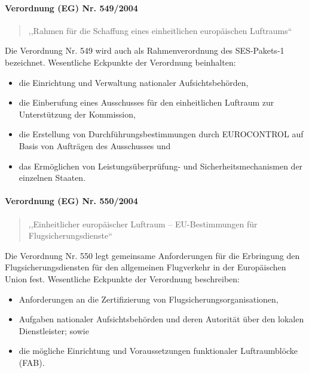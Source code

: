 \pagebreak

\paragraph{Verordnung (EG) Nr. 549/2004} \label{er_549}
    \begin{quote}
        ,,Rahmen für die Schaffung eines einheitlichen europäischen Luftraums``\\
        \cite{2004R0549, 2004R0549_summary}
    \end{quote}
Die Verordnung Nr. 549 wird auch als Rahmenverordnung des \ac{SES}-Pakets-1 bezeichnet.
Wesentliche Eckpunkte der Verordnung beinhalten:
    \begin{itemize}
        \item die Einrichtung und Verwaltung nationaler Aufsichtsbehörden,
        \item die Einberufung eines Ausschusses für den einheitlichen Luftraum zur Unterstützung der Kommission,
        \item die Erstellung von Durchführungsbestimmungen durch EUROCONTROL auf Basis von Aufträgen des Ausschusses und
        \item    das Ermöglichen von Leistungsüberprüfung- und Sicherheitsmechanismen der einzelnen Staaten. \cite{2004R0549_summary}
    \end{itemize}

        
\paragraph{Verordnung (EG) Nr. 550/2004} \label{er_550}
\begin{quote}
    ,,Einheitlicher europäischer Luftraum – EU-Bestimmungen für Flugsicherungsdienste`` 
    \cite{2004R0550, 2004R0550_summary}
\end{quote}
    Die Verordnung Nr. 550 legt gemeinsame Anforderungen für die Erbringung den Flugsicherungsdiensten für den allgemeinen Flugverkehr in der Europäischen Union fest. 
Wesentliche Eckpunkte der Verordnung beschreiben:
    \begin{itemize}
        \item Anforderungen an die Zertifizierung von Flugsicherungsorganisationen,
        \item Aufgaben nationaler Aufsichtsbehörden und deren Autorität über den lokalen Dienstleister; sowie
        \item die mögliche Einrichtung und Voraussetzungen funktionaler Luftraumblöcke (\acs{FAB}). \cite{2004R0550_summary}
    \end{itemize}

